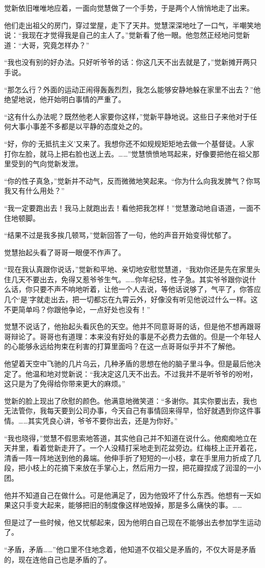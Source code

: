 \par 觉新依旧唯唯地应着，一面向觉慧做了一个手势，于是两个人悄悄地走了出来。
\par 他们走出祖父的房门，穿过堂屋，走下了天井。觉慧深深地吐了一口气，半嘲笑地说：“我现在才觉得我是自己的主人了。”觉新看了他一眼。他忽然正经地问觉新道：“大哥，究竟怎样办？”
\par “我也没有别的好办法。只好听爷爷的话：你这几天不出去就是了，”觉新摊开两只手说。
\par “那怎么行？外面的运动正闹得轰轰烈烈，我怎么能够安静地躲在家里不出去？”他绝望地说，他开始明白事情的严重了。
\par “这有什么办法呢？既然他老人家要你这样，”觉新平静地说。这些日子来他对于任何大事小事差不多都是以平静的态度处之的。
\par “好，你的‘无抵抗主义’又来了。我想你还不如规规矩矩地去做一个基督徒。人家打你左脸，就马上把右脸也送上去。……”觉慧愤愤地骂起来，好像要把他在祖父那里受到的气向觉新发泄。
\par “你的性子真急，”觉新并不动气，反而微微地笑起来。“你为什么向我发脾气？你骂我又有什么用处？”
\par “我一定要跑出去！我马上就跑出去！看他把我怎样！”觉慧激动地自语道，一面不住地顿脚。
\par “结果不过是我多挨几顿骂，”觉新回答了一句，他的声音开始变得忧郁了。
\par 觉慧抬起头看了哥哥一眼便不作声了。
\par “现在我认真跟你说话，”觉新和平地、亲切地安慰觉慧道，“我劝你还是先在家里头住几天不要出去，免得又惹爷爷生气。……你年纪轻，性子急。其实爷爷跟你说什么话，你只要不声不响地听着，让他一个人去说，等他话说够了，气平了，你答应几个‘是’字就走出去，把一切都忘在九霄云外，好像没有听见他说过什么一样。这不更简单吗？你跟他争论，一点好处也没有！”
\par 觉慧不说话了，他抬起头看灰色的天空。他并不同意哥哥的话，但是他不想再跟哥哥辩论了。哥哥也有道理：本来没有好处的事是不必费力去做的。但是一个年轻人的心能够永远给拘束在利害的打算里面吗？在这一点哥哥似乎并不了解他。
\par 他望着天空中飞驰的几片乌云，几种矛盾的思想在他的脑子里斗争。但是最后他决定了。他温和地对觉新说：“我决定这几天不出去。不过我并不是听爷爷的吩咐，这只是为了免得给你带来更大的麻烦。”
\par 觉新的脸上现出了欣慰的颜色。他满意地微笑道：“多谢你。其实你要出去，我也无法管你，我每天要到公司办事，今天自己有事情回来得早，恰好就遇到你这件事情。……其实凭良心讲，爷爷不要你出去，还是为你好。”
\par “我也晓得，”觉慧不假思索地答道，其实他自己并不知道在说什么。他痴痴地立在天井里，看着觉新走开了。一个人没精打采地走到花盆旁边。红梅枝上正开着花，清香一阵一阵地送到他的鼻端。他伸手折了短短的一小枝，拿在手里用力折成了几段，把小枝上的花摘下来放在手掌心上，然后用力一捏，把花瓣捏成了润湿的一小团。
\par 他并不知道自己在做什么。可是他满足了，因为他毁坏了什么东西。他想有一天如果这只手变大起来，能够把旧的制度像这样地毁掉，那是多么痛快的事。……
\par 但是过了一些时候，他又忧郁起来，因为他明白自己现在不能够出去参加学生运动了。
\par “矛盾，矛盾……”他口里不住地念着，他知道不仅祖父是矛盾的，不仅大哥是矛盾的，现在连他自己也是矛盾的了。


